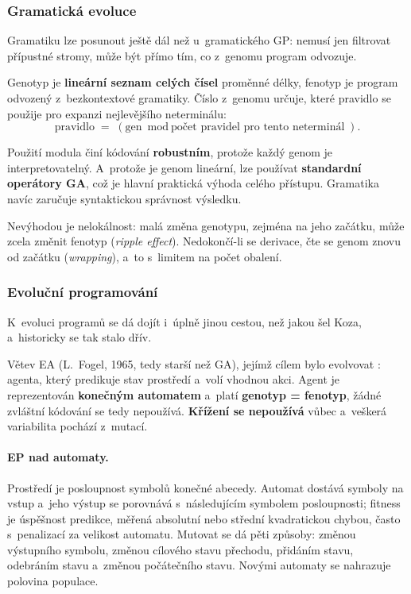 \documentclass[11pt,a4paper]{article}
\theoremstyle{definition}
\begin{document}
\subsubsection{Gramatická evoluce}

Gramatiku lze posunout ještě dál než u~gramatického GP: nemusí jen filtrovat přípustné
stromy, může být přímo tím, co z~genomu program odvozuje.

\begin{defbox}
Genotyp je \textbf{lineární seznam celých čísel} proměnné délky, fenotyp je program
odvozený z~bezkontextové gramatiky. Číslo z~genomu určuje, které pravidlo se použije pro
expanzi nejlevějšího neterminálu:
\[
\text{pravidlo} \;=\; (\text{gen} \bmod \text{počet pravidel pro tento neterminál}).
\]
\end{defbox}

Použití modula činí kódování \textbf{robustním}, protože každý genom je
interpretovatelný. A~protože je genom lineární, lze používat \textbf{standardní operátory
GA}, což je hlavní praktická výhoda celého přístupu. Gramatika navíc zaručuje
syntaktickou správnost výsledku.

Nevýhodou je nelokálnost: malá změna genotypu, zejména na jeho začátku, může zcela
změnit fenotyp (\emph{ripple effect}). Nedokončí-li se derivace, čte se genom znovu od
začátku (\emph{wrapping}), a~to s~limitem na počet obalení.

\subsubsection{Evoluční programování}

K~evoluci programů se dá dojít i~úplně jinou cestou, než jakou šel Koza, a~historicky
se tak stalo dřív.

\begin{defbox}
Větev EA (L.~Fogel, 1965, tedy starší než GA), jejímž cílem bylo evolvovat : agenta, který predikuje stav prostředí a~volí vhodnou akci. Agent je
reprezentován \textbf{konečným automatem} a~platí \textbf{genotyp = fenotyp}, žádné
zvláštní kódování se tedy nepoužívá. \textbf{Křížení se nepoužívá} vůbec a~veškerá
variabilita pochází z~mutací.
\end{defbox}

\paragraph{EP nad automaty.} Prostředí je posloupnost symbolů konečné abecedy. Automat
dostává symboly na vstup a~jeho výstup se porovnává s~následujícím symbolem posloupnosti;
fitness je úspěšnost predikce, měřená absolutní nebo střední kvadratickou chybou, často
s~penalizací za velikost automatu. Mutovat se dá pěti způsoby: změnou výstupního symbolu,
změnou cílového stavu přechodu, přidáním stavu, odebráním stavu a~změnou počátečního
stavu. Novými automaty se nahrazuje polovina populace.
\end{document}
